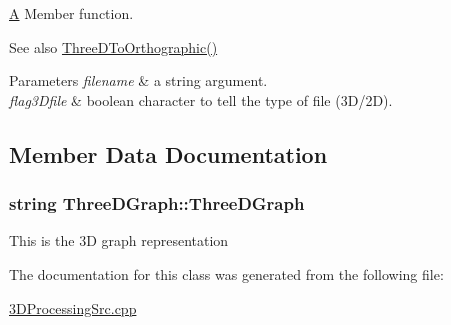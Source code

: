 \hyperlink{classA}{A} Member function. 

\begin{DoxySeeAlso}{See also}
\hyperlink{classThreeDGraph_a7f484956c7d616b6724e758ed43e5bed}{Three\+D\+To\+Orthographic()} 
\end{DoxySeeAlso}

\begin{DoxyParams}{Parameters}
{\em filename} & a string argument. \\
\hline
{\em flag3\+Dfile} & boolean character to tell the type of file (3\+D/2D). \\
\hline
\end{DoxyParams}


\subsection{Member Data Documentation}
\subsubsection[{\texorpdfstring{Three\+D\+Graph}{ThreeDGraph}}]{\setlength{\rightskip}{0pt plus 5cm}string Three\+D\+Graph\+::\+Three\+D\+Graph\hspace{0.3cm}{\ttfamily [static]}}\hypertarget{classThreeDGraph_ab2553252d92e1a3e81e58b81ef95220a}{}\label{classThreeDGraph_ab2553252d92e1a3e81e58b81ef95220a}
This is the 3D graph representation 

The documentation for this class was generated from the following file\+:\begin{DoxyCompactItemize}
\item 
\hyperlink{3DProcessingSrc_8cpp}{3\+D\+Processing\+Src.\+cpp}\end{DoxyCompactItemize}
